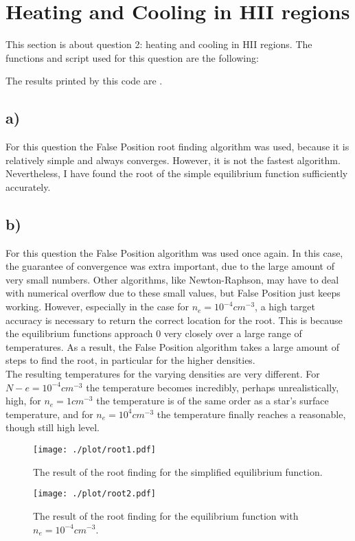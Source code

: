 \section{Heating and Cooling in HII regions}
This section is about question 2: heating and cooling in HII regions.
The functions and script used for this question are the following:

The results printed by this code are
.
\subsection*{a)}
For this question the False Position root finding algorithm was used, because it is relatively simple and always converges. However, it is not the fastest algorithm. Nevertheless, I have found the root of the simple equilibrium function sufficiently accurately.

\subsection*{b)}
For this question the False Position algorithm was used once again. In this case, the guarantee of convergence was extra important, due to the large amount of very small numbers. Other algorithms, like Newton-Raphson, may have to deal with numerical overflow due to these small values, but False Position just keeps working. However, especially in the case for $n_e = 10^{-4} cm^{-3}$, a high target accuracy is necessary to return the correct location for the root. This is because the equilibrium functions approach 0 very closely over a large range of temperatures. As a result, the False Position algorithm takes a large amount of steps to find the root, in particular for the higher densities.\\
The resulting temperatures for the varying densities are very different. For $N-e = 10^{-4} cm^{-3}$ the temperature becomes incredibly, perhaps unrealistically, high, for $n_e = 1 cm^{-3}$ the temperature is of the same order as a star's surface temperature, and for $n_e = 10^4 cm^{-3}$ the temperature finally reaches a reasonable, though still high level.

\begin{figure}[!h]
    \centering
    \texttt{[image: ./plot/root1.pdf]}
    \caption{The result of the root finding for the simplified equilibrium function.}
    \label{fig:root1}
\end{figure}

\begin{figure}[!h]
    \centering
    \texttt{[image: ./plot/root2.pdf]}
    \caption{The result of the root finding for the equilibrium function with $n_e = 10^{-4} cm^{-3}$.}
    \label{fig:root2}
\end{figure}

